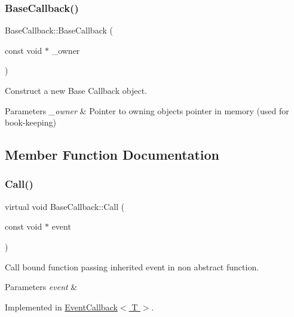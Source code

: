 \subsubsection{\texorpdfstring{Base\+Callback()}{BaseCallback()}}
{\footnotesize\ttfamily Base\+Callback\+::\+Base\+Callback (\begin{DoxyParamCaption}\item[{const void $\ast$}]{\+\_\+owner }\end{DoxyParamCaption})\hspace{0.3cm}{\ttfamily [inline]}}



Construct a new Base Callback object. 


\begin{DoxyParams}{Parameters}
{\em \+\_\+owner} & Pointer to owning object\textquotesingle{}s pointer in memory (used for book-\/keeping) \\
\hline
\end{DoxyParams}


\subsection{Member Function Documentation}
\mbox{\label{classBaseCallback_af87d16a88aaf3c429e5f020798f97a8b}} 
\subsubsection{\texorpdfstring{Call()}{Call()}}
{\footnotesize\ttfamily virtual void Base\+Callback\+::\+Call (\begin{DoxyParamCaption}\item[{const void $\ast$}]{event }\end{DoxyParamCaption})\hspace{0.3cm}{\ttfamily [pure virtual]}}



Call bound function passing inherited event in non abstract function. 


\begin{DoxyParams}{Parameters}
{\em event} & \\
\hline
\end{DoxyParams}


Implemented in \hyperlink{classEventCallback_ad34e4a69e56733e07342d0c56cd15dfc}{Event\+Callback$<$ T $>$}.

